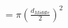 \documentclass[preview]{standalone}
\begin{document}
\begin{align*}
= \pi \left(\frac{d_{Middle}}{2}\right)^2
\end{align*}
\end{document}
